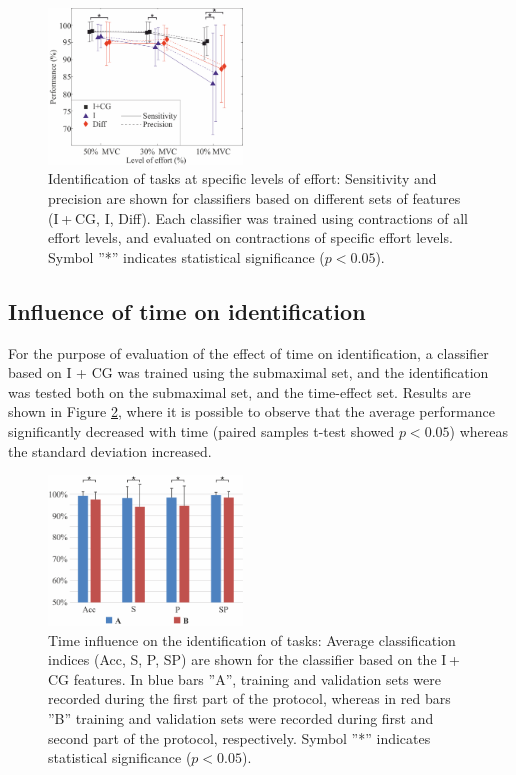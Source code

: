 \begin{figure}[ht]
\centering
\includegraphics[width=0.459\textwidth]{Images/figure1_5.png}
\caption{Identification of tasks at specific levels of effort: Sensitivity and precision are shown for classifiers based on different sets of features (I + CG, I, Diff). Each classifier was trained using contractions of all effort levels, and evaluated on contractions of specific effort levels. Symbol ”*” indicates statistical significance ($p < 0.05$).}
\label{fig:1-5}
\end{figure}      


\subsection{Influence of time on identification}
For the purpose of evaluation of the effect of time on identification, a classifier based on I + CG was trained using the submaximal set, and the identification was tested both on the submaximal set, and the time-effect set. Results are shown in Figure \ref{fig:1-6}, where it is possible to observe that the average performance significantly decreased with time (paired samples t-test showed $p < 0.05$) whereas the standard deviation increased.

\begin{figure}[ht]
\centering
\includegraphics[width=0.459\textwidth]{Images/figure1_6.png}
\caption{Time influence on the identification of tasks: Average classification indices (Acc, S, P, SP) are shown for the classifier based on the I + CG features. In blue bars ”A”, training and validation sets were recorded during the first part of the protocol, whereas in red bars ”B” training and validation sets were recorded during first and second part of the protocol, respectively. Symbol ”*” indicates statistical significance ($p < 0.05$).}
\label{fig:1-6}
\end{figure}      


